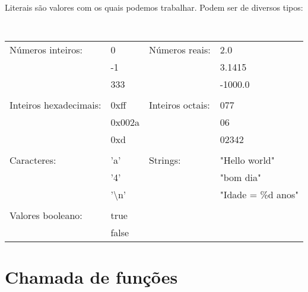 Literais são valores com os quais podemos trabalhar. Podem ser de diversos tipos:

\nobreakspace

{\tt
\begin{tabular}{llll}
Números inteiros:        & 0                     & Números reais:    & 2.0       \\
                         & -1                    &                   & 3.1415    \\
                         & 333                   &                   & -1000.0   \\
\\
Inteiros hexadecimais:   & 0xff                  & Inteiros octais:  & 077       \\
                         & 0x002a                &                   & 06        \\
                         & 0xd                   &                   & 02342     \\
\\
Caracteres:              & 'a'                   & Strings:          & "Hello world"       \\
                         & '4'                   &                   & "bom dia"           \\
                         & '\textbackslash n'    &                   & "Idade = \%d anos"   \\
\\
Valores booleano:        & true                  &                   &                      \\
                         & false                 &                   &                      \\
\end{tabular}
}


\section{Chamada de funções}

